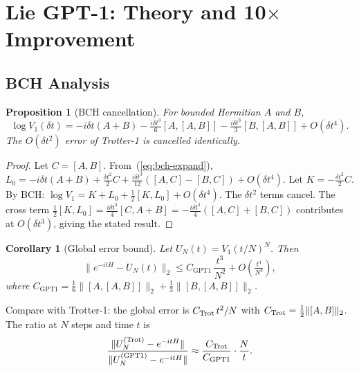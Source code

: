 \documentclass[aps,prxquantum,twocolumn,nofootinbib]{revtex4-2}
\newtheorem{proposition}{Proposition}
\newtheorem{corollary}{Corollary}[proposition]
\begin{document}
\section{Lie GPT-1: Theory and 10$\times$ Improvement}
\label{sec:gpt1}

\subsection{BCH Analysis}

\begin{proposition}[BCH cancellation]
  \label{prop:bch}
  For bounded Hermitian $A$ and $B$,
  \begin{equation}
    \log V_1(\delta t)
    = -i\delta t(A+B) - \tfrac{i\delta t^3}{6}[A,[A,B]]
      - \tfrac{i\delta t^3}{3}[B,[A,B]] + O(\delta t^4).
  \end{equation}
  The $O(\delta t^2)$ error of Trotter-1 is cancelled identically.
\end{proposition}

\begin{proof}
  Let $C=[A,B]$. From~(\ref{eq:bch-expand}),
  $L_0 = -i\delta t(A+B)+\tfrac{\delta t^2}{2}C
        +\tfrac{i\delta t^3}{12}([A,C]-[B,C]) + O(\delta t^4)$.
  Let $K=-\tfrac{\delta t^2}{2}C$. By BCH:
  $\log V_1=K+L_0+\tfrac{1}{2}[K,L_0]+O(\delta t^4)$.
  The $\delta t^2$ terms cancel. The cross term
  $\tfrac{1}{2}[K,L_0]=\tfrac{i\delta t^3}{4}[C,A+B]
   = -\tfrac{i\delta t^3}{4}([A,C]+[B,C])$
  contributes at $O(\delta t^3)$, giving the stated result.
\end{proof}

\begin{corollary}[Global error bound]
  \label{cor:global}
  Let $U_N(t) = V_1(t/N)^N$. Then
  \begin{equation}
    \|e^{-itH} - U_N(t)\|_2
    \leq C_{\mathrm{GPT1}}\,\frac{t^3}{N^2}
    + O\!\left(\tfrac{t^4}{N^3}\right),
  \end{equation}
  where $C_{\mathrm{GPT1}}=\frac{1}{6}\|[A,[A,B]]\|_2
  +\frac{1}{3}\|[B,[A,B]]\|_2$.
\end{corollary}

Compare with Trotter-1: the global error is $C_{\rm Trot}\,t^2/N$
with $C_{\rm Trot}=\frac{1}{2}\|[A,B]\|_2$.
The ratio at $N$ steps and time $t$ is
\begin{equation}
  \frac{\|U_N^{({\rm Trot})}-e^{-itH}\|}{\|U_N^{({\rm GPT1})}-e^{-itH}\|}
  \approx \frac{C_{\rm Trot}}{C_{\rm GPT1}}\cdot\frac{N}{t}.
  \label{eq:ratio-formula}
\end{equation}
\end{document}

